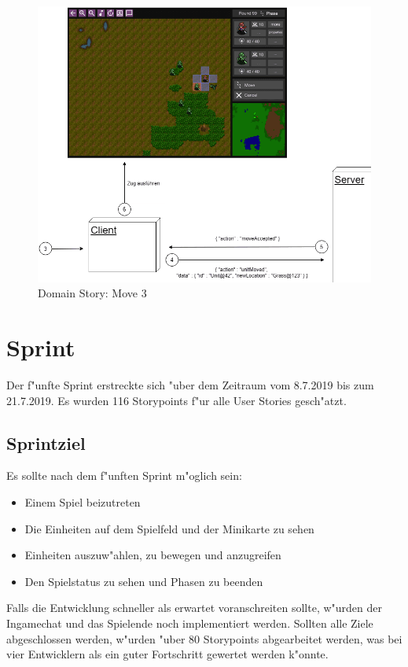 \documentclass[12pt, titlepage]{scrartcl}
\newcommand{\RN}[1]{%
	\textup{\uppercase\expandafter{\romannumeral#1}}%
}
\begin{document}
		    	\begin{figure}[H] 
		    		\centering
		    		\includegraphics[width=\textwidth]{images/domain_stories/moveStory3.png}
		    		\caption{Domain Story: Move 3}
		    		\label{Domain_Story_Move_3}
		    	\end{figure}
	\newpage
	\section{Sprint \RN{5}}
	    Der f"unfte Sprint erstreckte sich "uber dem Zeitraum vom 8.7.2019 bis zum 21.7.2019. Es wurden 116 Storypoints f"ur alle User Stories gesch"atzt.
	    \subsection{Sprintziel} \label{Sprintgoal_5}
	        Es sollte nach dem f"unften Sprint m"oglich sein:
	        \begin{itemize}
	            \item Einem Spiel beizutreten
	            \item Die Einheiten auf dem Spielfeld und der Minikarte zu sehen
	            \item Einheiten auszuw"ahlen, zu bewegen und anzugreifen
	            \item Den Spielstatus zu sehen und Phasen zu beenden
	        \end{itemize}
	        Falls die Entwicklung schneller als erwartet voranschreiten sollte, w"urden der Ingamechat und das Spielende noch implementiert werden. Sollten alle Ziele abgeschlossen werden, w"urden "uber 80 Storypoints abgearbeitet werden, was bei vier Entwicklern als ein guter Fortschritt gewertet werden k"onnte.
\end{document}

